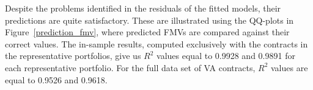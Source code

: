 

Despite the problems identified in the residuals of the fitted models, their predictions are quite satisfactory. These are illustrated using the QQ-plots in Figure~\ref{prediction_fmv}, where predicted FMVs are compared against their correct values. The in-sample results, computed exclusively with the contracts in the representative portfolios, give us $R^2$ values equal to 0.9928 and 0.9891 for each representative portfolio. For the full data set of VA contracts, $R^2$ values are equal to 0.9526 and 0.9618.


